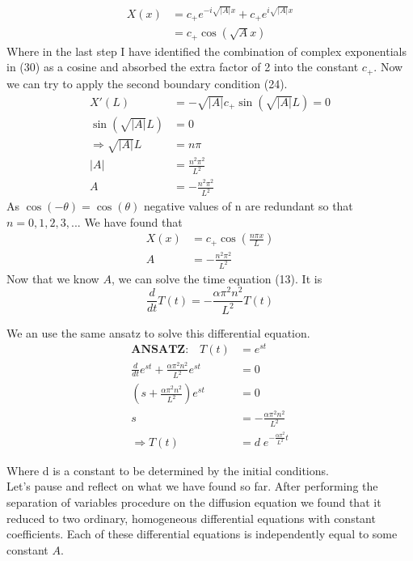 \documentclass[a4paper, 11pt]{article}
\newenvironment{solution}{%
	\begin{list}{}{%
			\setlength{\topsep}{0pt}%
			\setlength{\leftmargin}{0.5cm}%
			\setlength{\rightmargin}{0.5cm}%
			\setlength{\listparindent}{\parindent}%
			\setlength{\itemindent}{\parindent}%
			\setlength{\parsep}{\parskip}%
		}%
		\item[]}{\end{list}}
\begin{document}
\begin{enumerate}[leftmargin=0em]
\begin{solution}
    \begin{align}
      X(x) &= c_+e^{-i\sqrt{|A|}x}+c_+e^{i\sqrt{|A|}x} \\
       &= c_+\cos(\sqrt{A}x) 
    \end{align}
   Where in the last step I have identified the combination of complex
   exponentials in (30) as a cosine and absorbed the extra factor of 2 into the
   constant $c_+$. Now we can try to apply the second boundary condition (24).
   \begin{align}
     X'(L) &= -\sqrt{|A|}c_+\sin(\sqrt{|A|}L) = 0 \\
     \sin(\sqrt{|A|}L) &= 0 \\
     \Rightarrow \sqrt{|A|}L &= n\pi \\
     |A| &= \frac{n^2 \pi^2}{L^2}\\
		 A &= -\frac{n^2 \pi^2}{L^2}
   \end{align}
   As $\cos(-\theta)=\cos(\theta)$ negative values of n are redundant so that
   $n = 0, 1, 2, 3, ...$ We have found that
   \begin{align}
     X(x) &= c_+\cos\left(\frac{n\pi x}{L}\right)\\
     A &= -\frac{n^2\pi^2}{L^2}
   \end{align}
   Now that we know $A$, we can solve the time equation (13). It is
   \begin{equation}
     \frac{d}{dt}T(t) = -\frac{\alpha \pi^2 n^2}{L^2}T(t)
   \end{equation}

   We an use the same ansatz to solve this differential equation.
   \begin{align}
     \textbf{ANSATZ:}\quad T(t) &= e^{st} \\
     \frac{d}{dt}e^{st}+\frac{\alpha\pi^2n^2}{L^2}e^{st}&= 0 \\
     \left( s+\frac{\alpha \pi^2n^2}{L^2} \right)e^{st}&=0  \\
     s &= -\frac{\alpha \pi^2 n^2}{L^2} \\
     \Rightarrow T(t) &= d\; e^{-\frac{\alpha \pi^2}{L^2}t} 
   \end{align}

   Where d is a constant to be determined by the initial conditions. \\

   Let's pause and reflect on what we have found so far. After performing the
   separation of variables procedure on the diffusion equation we found that it
   reduced to two ordinary, homogeneous differential equations with constant
   coefficients. Each of these differential equations is independently equal to
   some constant $A$. \\


\end{solution}
\end{enumerate}
\end{document}
